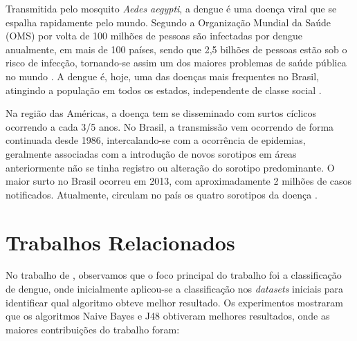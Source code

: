 \documentclass[
	12pt,				%
	openright,			%
	oneside,	
	a4paper,				%
	english,				%
	brazil				%
]{abntex2/abntex2} %
\begin{document}

	Transmitida pelo mosquito \textit{Aedes aegypti}, a dengue é uma doença viral que se espalha rapidamente pelo mundo. Segundo a Organização Mundial da Saúde (OMS) por volta de 100 milhões de pessoas são infectadas por dengue anualmente, em mais de 100 países, sendo que 2,5 bilhões de pessoas estão sob o risco de infecção, tornando-se assim um dos maiores problemas de saúde pública no mundo \cite{bhatt:2013}. A dengue é, hoje, uma das doenças mais frequentes no Brasil, atingindo a população em todos os estados, independente de classe social \cite{saude:2008}.
	
	Na região das Américas, a doença tem se disseminado com surtos cíclicos ocorrendo a cada 3/5 anos. No Brasil, a transmissão vem ocorrendo de forma continuada desde 1986, intercalando-se com a ocorrência de epidemias, geralmente associadas com a introdução de novos sorotipos em áreas anteriormente não se tinha registro ou alteração do sorotipo predominante. O maior surto no Brasil ocorreu em 2013, com aproximadamente 2 milhões de casos notificados. Atualmente, circulam no país os quatro sorotipos da doença \cite{MS:2015}.
	

	
	\section{Trabalhos Relacionados}	
	
	No trabalho de \cite{shakil:2015}, observamos que o foco principal do trabalho foi a classificação de dengue, onde inicialmente aplicou-se a classificação nos \textit{datasets} iniciais para identificar qual algoritmo obteve melhor resultado. Os experimentos mostraram que os algoritmos Naive Bayes e J48 obtiveram melhores resultados, onde as maiores contribuições do trabalho foram:
	
\end{document}

